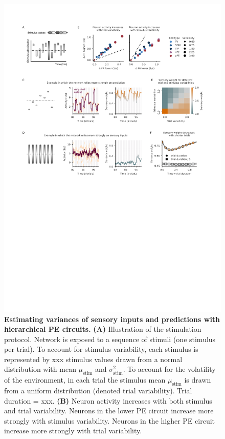 \documentclass[10pt,a4paper,draft]{article}
\begin{document}
\begin{figure}[t!]
	\centering
    \includegraphics[width=1\linewidth]{../results/figures/final/Fig_3}
\caption{\footnotesize{\bf Estimating variances of sensory inputs and predictions with hierarchical PE circuits.\newline} 
{\bf (A)} Illustration of the stimulation protocol. Network is exposed to a sequence of stimuli (one stimulus per trial). To account for stimulus variability, each stimulus is represented by xxx stimulus values drawn from a normal distribution with mean $\mu_\mathrm{stim}$ and $\sigma_\mathrm{stim}^2$. To account for the volatility of the environment, in each trial the stimulus mean $\mu_\mathrm{stim}$ is drawn from a uniform distribution (denoted trial variability). Trial duration = xxx. 
{\bf (B)} Neuron activity increases with both stimulus and trial variability. Neurons in the lower PE circuit increase more strongly with stimulus variability. Neurons in the higher PE circuit increase more strongly with trial variability.
}
\end{figure}
\end{document}
